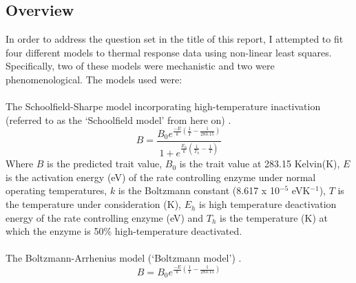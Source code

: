 \documentclass[11pt]{article}
\begin{document}
\subsection{Overview}
In order to address the question set in the title of this report, I attempted to fit four different models to thermal response data using non-linear least squares. Specifically, two of these models were mechanistic and two were phenomenological.
The models used were:
\\
\\
The Schoolfield-Sharpe model incorporating high-temperature inactivation (referred to as the `Schoolfield model' from here on) \cite{schoolfield1981non}.   
\begin{equation}
B = \frac{B_0 e^{\frac{-E}{k}(\frac{1}{T} - \frac{1}{283.15})}}{1 + e^{\frac{E_h}{k}(\frac{1}{T_h} - \frac{1}{T})}}
\end{equation} 
Where \begin{math}B\end{math} is the predicted trait value, \begin{math}B_0\end{math} is the trait value at 283.15 Kelvin(K), \begin{math}E\end{math} is the activation energy (eV) of the rate controlling enzyme under normal operating temperatures, \begin{math}k\end{math} is the Boltzmann constant (8.617 x 10\begin{math}^{-5}\end{math} eVK\begin{math}^{-1}\end{math}), \begin{math}T\end{math} is the temperature under consideration (K), \begin{math}E_h\end{math} is high temperature deactivation energy of the rate controlling enzyme (eV) and \begin{math}T_h\end{math} is the temperature (K) at which the enzyme is 50\% high-temperature deactivated. 
\\
\\
The Boltzmann-Arrhenius model (`Boltzmann model') \cite{schoolfield1981non}.
\begin{equation}
B = B_0 e^{\frac{-E}{k}(\frac{1}{T} - \frac{1}{283.15})}
\end{equation}
\end{document}
